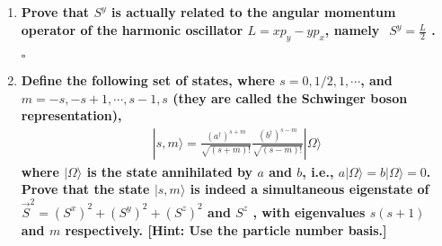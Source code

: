 \documentclass[../../main.tex]{subfiles}
\begin{document}
\begin{enumerate}
  \item \textbf{Prove that $S^{y}$ is actually related to the angular momentum operator of the harmonic oscillator $L = xp_{y} - yp_{x}$, namely $\begin{aligned}
    S^{y} = \frac{L}{2}
  \end{aligned}$.}
  
{}$\square$
  
  \item \textbf{Define the following set of states, where $s = 0, 1/2, 1, \cdots$, and $m = -s, -s+1,\cdots, s-1, s$
  (they are called the Schwinger boson representation),
  \begin{align*}
    |s,m\rangle = \frac{(a^{\dagger})^{s+m}}{\sqrt{(s+m)!}}\frac{(b^{\dagger})^{s-m}}{\sqrt{(s-m)!}}|\Omega\rangle
  \end{align*}
  where $|\Omega\rangle$ is the state annihilated by $a$ and $b$, i.e., $a|\Omega\rangle = b|\Omega\rangle = 0$. Prove that the state $|s, m\rangle$ is indeed a simultaneous eigenstate of $\vec{S}^{2} = (S^{x})^{2} + (S^{y})^{2} + (S^{z})^{2}$ and $S^{z}$ , with eigenvalues $s(s + 1)$ and $m$ respectively. [Hint: Use the particle number basis.]}


\end{enumerate}
\end{document}
